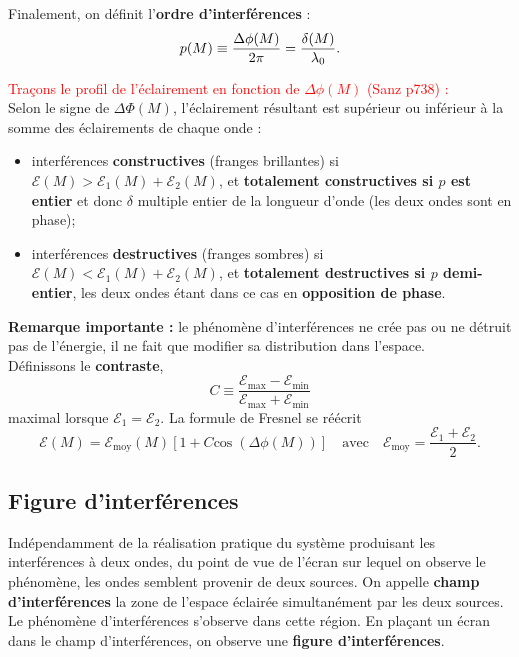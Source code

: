 \documentclass[11pt,a4paper]{report}
\begin{document}
Finalement, on définit l'\textbf{ordre d'interférences} :
\begin{equation}
	p(M) \equiv \frac{\Delta \phi(M)}{2\pi} = \frac{\delta(M)}{\lambda_0}.\\
\end{equation}

\textcolor{red}{Traçons le profil de l'éclairement en fonction de $\Delta\phi(M)$ (Sanz p738) :}\\

Selon le signe de $\Delta \Phi(M)$, l'éclairement résultant est supérieur ou inférieur à la somme des éclairements de chaque onde :
\begin{itemize}
	\item interférences \textbf{constructives} (franges brillantes) si 
	$\mathcal{E}(M)>\mathcal{E}_1(M)+\mathcal{E}_2(M)$, et \textbf{totalement constructives si $p$ 
	est entier} et donc $\delta$ multiple entier de la longueur d'onde (les deux ondes sont en phase);
	\item interférences \textbf{destructives} (franges sombres) si $\mathcal{E}(M)<\mathcal{E}_1(M)+		\mathcal{E}_2(M)$, et \textbf{totalement destructives si $p$ demi-entier}, les deux ondes étant 		dans ce cas en \textbf{opposition de phase}.\\
\end{itemize}

\textbf{Remarque importante :} le phénomène d'interférences ne crée pas ou ne détruit pas de l'énergie, il ne fait que modifier sa distribution dans l'espace.\\

Définissons le \textbf{contraste},
\begin{equation}
	C \equiv \frac{\mathcal{E}_\text{max} - \mathcal{E}_\text{min}}
	{\mathcal{E}_\text{max} + \mathcal{E}_\text{min}}
\end{equation}
maximal lorsque $\mathcal{E}_1 = \mathcal{E}_2$. La formule de Fresnel se réécrit
\begin{equation}
	\boxed{\mathcal{E}(M) = \mathcal{E}_\text{moy}(M)\left[1 
	+ C\text{cos}\;\left(\Delta\phi(M)\right)\right]} \quad\text{avec}\quad 
	\mathcal{E}_\text{moy} = \frac{\mathcal{E}_1 + \mathcal{E}_2}{2}.
\end{equation}

\subsection{Figure d'interférences}

Indépendamment de la réalisation pratique du système produisant les interférences à deux ondes, du point de vue de l'écran sur lequel on observe le phénomène, les ondes semblent provenir de deux sources. On appelle \textbf{champ d'interférences} la zone de l'espace éclairée simultanément par les deux sources. Le phénomène d'interférences s'observe dans cette région. En plaçant un écran dans le champ d'interférences, on observe une \textbf{figure d'interférences}.\\ 
\end{document}
